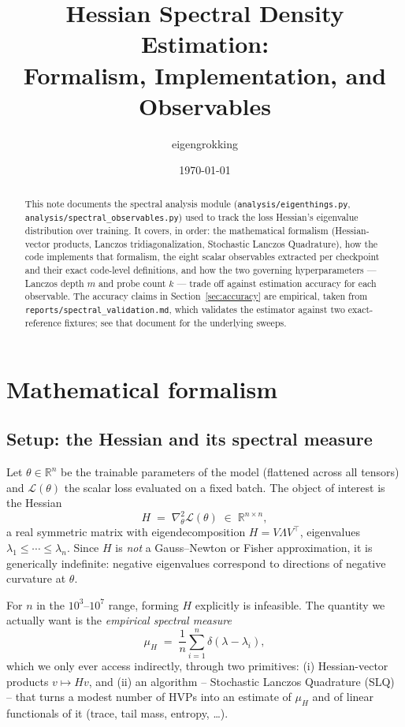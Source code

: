 \documentclass[11pt]{article}
\title{Hessian Spectral Density Estimation:\\
Formalism, Implementation, and Observables}
\author{eigengrokking}
\date{\today}
\newcommand{\code}[1]{\texttt{#1}}
\newcommand{\R}{\mathbb{R}}
\begin{document}
\maketitle

\begin{abstract}
This note documents the spectral analysis module (\code{analysis/eigenthings.py},
\code{analysis/spectral_observables.py}) used to track the loss Hessian's
eigenvalue distribution over training. It covers, in order: the mathematical
formalism (Hessian-vector products, Lanczos tridiagonalization, Stochastic
Lanczos Quadrature), how the code implements that formalism, the eight scalar
observables extracted per checkpoint and their exact code-level definitions,
and how the two governing hyperparameters --- Lanczos depth \(m\) and probe
count \(k\) --- trade off against estimation accuracy for each observable.
The accuracy claims in Section~\ref{sec:accuracy} are empirical, taken from
\code{reports/spectral_validation.md}, which validates the estimator against
two exact-reference fixtures; see that document for the underlying sweeps.
\end{abstract}

\tableofcontents

\section{Mathematical formalism}
\label{sec:formalism}

\subsection{Setup: the Hessian and its spectral measure}

Let \(\theta \in \R^n\) be the trainable parameters of the model (flattened
across all tensors) and \(\mathcal{L}(\theta)\) the scalar loss evaluated on
a fixed batch. The object of interest is the Hessian
\[
H \;=\; \nabla^2_\theta \mathcal{L}(\theta) \;\in\; \R^{n\times n},
\]
a real symmetric matrix with eigendecomposition \(H = V\Lambda V^\top\),
eigenvalues \(\lambda_1 \le \cdots \le \lambda_n\). Since \(H\) is
\emph{not} a Gauss--Newton or Fisher approximation, it is generically
indefinite: negative eigenvalues correspond to directions of negative
curvature at \(\theta\).

For \(n\) in the \(10^3\)--\(10^7\) range, forming \(H\) explicitly is
infeasible. The quantity we actually want is the \emph{empirical spectral
measure}
\[
\mu_H \;=\; \frac{1}{n}\sum_{i=1}^n \delta(\lambda - \lambda_i),
\]
which we only ever access indirectly, through two primitives: (i)
Hessian-vector products \(v \mapsto Hv\), and (ii) an algorithm --
Stochastic Lanczos Quadrature (SLQ) -- that turns a modest number of HVPs
into an estimate of \(\mu_H\) and of linear functionals of it (trace,
tail mass, entropy, \dots).
\end{document}
